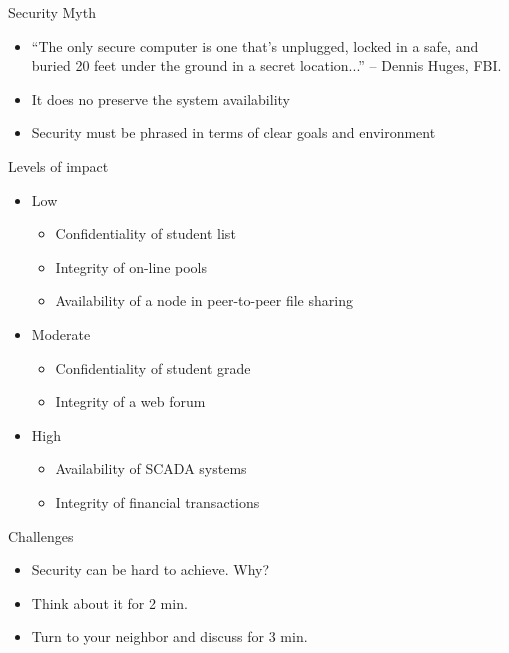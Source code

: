 \documentclass{beamer}
\begin{document}
\begin{frame}{Security Myth}
  
  \begin{itemize}
\item   ``The only secure computer is one that's unplugged, locked in a safe,
  and buried 20 feet under the ground in a secret location...'' --
  Dennis Huges, FBI.
\item<2-> It does no preserve the system availability
\item<2->Security must be phrased in terms of clear goals and
environment
  \end{itemize}
\end{frame}

\begin{frame}{Levels of impact}
  \begin{itemize}
  \item Low
    \begin{itemize}
      \item Confidentiality of student list
      \item Integrity of on-line pools
      \item Availability of a node in peer-to-peer file sharing
    \end{itemize}
  \item Moderate    
    \begin{itemize}
      \item Confidentiality of student grade
      \item Integrity of a web forum
    \end{itemize}
  \item High
    \begin{itemize}
      \item Availability of SCADA systems
      \item Integrity of financial transactions
    \end{itemize}
  \end{itemize}
\end{frame}

\begin{frame}{Challenges}
  \begin{itemize}
  \item Security can be hard to achieve. Why? 
  \item Think about it for 2 min. 
  \item Turn to your neighbor and discuss for 3 min.
  \end{itemize}
\end{frame}
 
\end{document}
